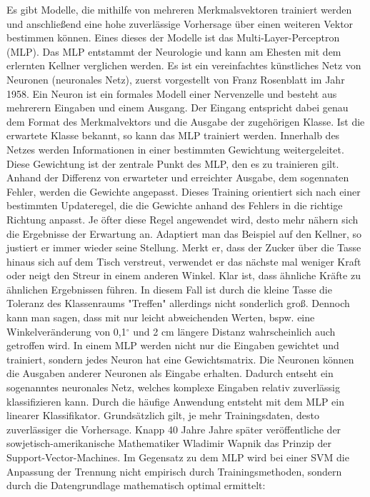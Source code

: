Es gibt Modelle, die mithilfe von mehreren Merkmalsvektoren trainiert werden und
anschließend eine hohe zuverlässige Vorhersage über einen weiteren Vektor bestimmen können.
Eines dieses der Modelle ist das Multi-Layer-Perceptron (MLP).
Das MLP entstammt der Neurologie und kann am Ehesten mit dem erlernten Kellner verglichen werden.
Es ist ein vereinfachtes künstliches Netz von Neuronen (neuronales Netz), zuerst vorgestellt von Franz Rosenblatt im Jahr 1958.
Ein Neuron ist ein formales Modell einer Nervenzelle und besteht aus mehrerern Eingaben und einem Ausgang.
Der Eingang entspricht dabei genau dem Format des Merkmalvektors und die Ausgabe der zugehörigen Klasse.
Ist die erwartete Klasse bekannt, so kann das MLP trainiert werden.
Innerhalb des Netzes werden Informationen in einer bestimmten Gewichtung weitergeleitet.
Diese Gewichtung ist der zentrale Punkt des MLP, den es zu trainieren gilt.
Anhand der Differenz von erwarteter und erreichter Ausgabe, dem sogennaten Fehler, werden die Gewichte angepasst.
Dieses Training orientiert sich nach einer bestimmten Updateregel, die die Gewichte anhand des Fehlers in die richtige Richtung anpasst.
Je öfter diese Regel angewendet wird, desto mehr nähern sich die Ergebnisse der Erwartung an. 
Adaptiert man das Beispiel auf den Kellner, so justiert er immer wieder seine Stellung. 
Merkt er, dass der Zucker über die Tasse hinaus sich auf dem Tisch verstreut, verwendet er das nächste mal weniger Kraft oder neigt den Streur in einem anderen Winkel. 
Klar ist, dass ähnliche Kräfte zu ähnlichen Ergebnissen führen. In diesem Fall ist durch die kleine Tasse die Toleranz des Klassenraums "{}Treffen"{} allerdings nicht sonderlich groß. 
Dennoch kann man sagen, dass mit nur leicht abweichenden Werten, bspw. eine Winkelveränderung von 0,1$^{\circ}$ und 2 cm längere Distanz wahrscheinlich auch getroffen wird.
In einem MLP werden nicht nur die Eingaben gewichtet und trainiert, sondern jedes Neuron hat eine Gewichtsmatrix. 
Die Neuronen können die Ausgaben anderer Neuronen als Eingabe erhalten. 
Dadurch entseht ein sogenanntes neuronales Netz, welches komplexe Eingaben relativ zuverlässig klassifizieren kann. 
Durch die häufige Anwendung entsteht mit dem MLP ein linearer Klassifikator. Grundsätzlich gilt, je mehr Trainingsdaten, desto zuverlässiger die Vorhersage. 
Knapp 40 Jahre Jahre später veröffentliche der sowjetisch-amerikanische Mathematiker Wladimir Wapnik \cite{Vapnik} das Prinzip der Support-Vector-Machines.
Im Gegensatz zu dem MLP wird bei einer SVM die Anpassung der Trennung nicht empirisch durch Trainingsmethoden,
sondern durch die Datengrundlage mathematisch optimal ermittelt:

